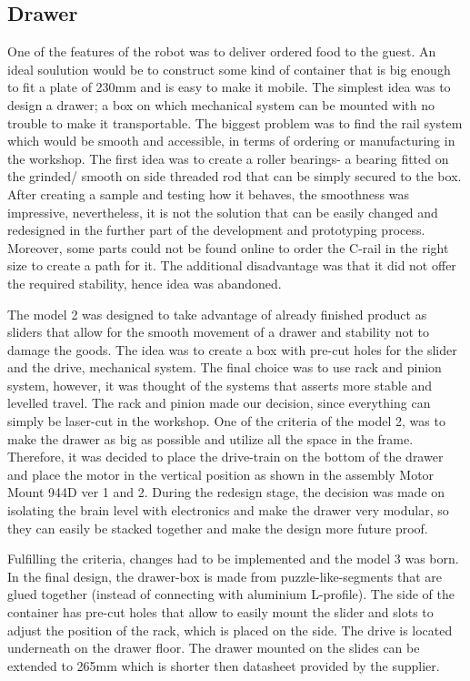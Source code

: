 \documentclass[11pt]{article}
\begin{document}
\subsection*{Drawer}
One of the features of the robot was to deliver ordered food to the guest. An ideal soulution would be to construct some kind of container that is big enough to fit a plate of 230mm and is easy to make it mobile. The simplest idea was to design a drawer; a box on which mechanical system can be mounted with no trouble to make it transportable. The biggest problem was to find the rail system which would be smooth and accessible, in terms of ordering or manufacturing in the workshop. The first idea was to create a roller bearings- a bearing fitted on the grinded/ smooth on side threaded rod that can be simply secured to the box. After creating a sample and testing how it behaves, the smoothness was impressive, nevertheless, it is not the solution that can be easily changed and redesigned in the further part of the development and prototyping process. Moreover, some parts could not be found online to order the C-rail in the right size to create a path for it. The additional disadvantage was that it did not offer the required stability, hence idea was abandoned. 


The model 2 was designed to take advantage of already finished product as sliders that allow for the smooth movement of a drawer and stability not to damage the goods. The idea was to create a box with pre-cut holes for the slider and the drive, mechanical system. The final choice was to use rack and pinion system, however, it was thought of the systems that asserts more stable and levelled travel. The rack and pinion made our decision, since everything can simply be laser-cut in the workshop. One of the criteria of the model 2, was to make the drawer as big as possible and utilize all the space in the frame. Therefore, it was decided to place the drive-train on the bottom of the drawer and place the motor in the vertical position as shown in the assembly Motor Mount 944D ver 1 and 2. During the redesign stage, the decision was made on isolating the brain level with electronics and make the drawer very modular, so they can easily be stacked together and make the design more future proof.


Fulfilling the criteria, changes had to be implemented and the model 3 was born. In the final design, the drawer-box is made from puzzle-like-segments that are glued together (instead of connecting with aluminium L-profile). The side of the container has pre-cut holes that allow to easily mount the slider and slots to adjust the position of the rack, which is placed on the side. The drive is located underneath on the drawer floor. The drawer mounted on the slides can be extended to 265mm which is shorter then datasheet provided by the supplier.
\end{document}
